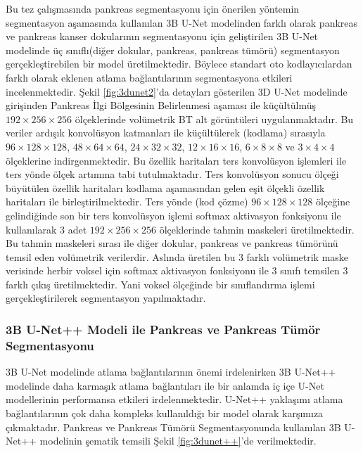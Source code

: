 Bu tez çalışmasında pankreas segmentasyonu için önerilen yöntemin segmentasyon aşamasında kullanılan 3B U-Net modelinden farklı olarak pankreas ve pankreas kanser dokularının segmentasyonu için geliştirilen 3B U-Net modelinde üç sınıflı(diğer dokular, pankreas, pankreas tümörü) segmentasyon gerçekleştirebilen bir model üretilmektedir. Böylece standart oto kodlayıcılardan farklı olarak eklenen atlama bağlantılarının segmentasyona etkileri incelenmektedir. Şekil \ref{fig:3dunet2}'da detayları gösterilen 3D U-Net modelinde girişinden Pankreas İlgi Bölgesinin Belirlenmesi aşaması ile küçültülmüş $192 \times 256 \times 256$ ölçeklerinde volümetrik BT alt görüntüleri uygulanmaktadır. Bu veriler ardışık konvolüsyon katmanları ile küçültülerek (kodlama) sırasıyla $96 \times 128 \times 128$, $48 \times 64 \times 64$, $24 \times 32 \times 32$, $12 \times 16 \times 16$, $6 \times 8 \times 8$ ve $3 \times 4 \times 4$ ölçeklerine indirgenmektedir. Bu özellik haritaları ters konvolüsyon işlemleri ile ters yönde ölçek artımına tabi tutulmaktadır. Ters konvolüsyon sonucu ölçeği büyütülen özellik haritaları kodlama aşamasından gelen eşit ölçekli özellik haritaları ile birleştirilmektedir. Ters yönde (kod çözme) $96 \times 128 \times 128$ ölçeğine gelindiğinde son bir ters konvolüsyon işlemi softmax aktivasyon fonksiyonu ile kullanılarak 3 adet $192 \times 256 \times 256$ ölçeklerinde tahmin maskeleri üretilmektedir. Bu tahmin maskeleri sırası ile diğer dokular, pankreas ve pankreas tümörünü temsil eden volümetrik verilerdir. Aslında üretilen bu 3 farklı volümetrik maske verisinde herbir voksel için softmax aktivasyon fonksiyonu ile 3 sınıfı temsilen 3 farklı çıkış üretilmektedir. Yani voksel ölçeğinde bir sınıflandırma işlemi gerçekleştirilerek segmentasyon yapılmaktadır.  


\subsubsection{3B U-Net++ Modeli ile Pankreas ve Pankreas Tümör Segmentasyonu}
3B U-Net modelinde atlama bağlantılarının önemi irdelenirken 3B U-Net++ modelinde daha karmaşık atlama bağlantıları ile bir anlamda iç içe U-Net modellerinin performansa etkileri irdelenmektedir. U-Net++ yaklaşımı atlama bağlantılarının çok daha kompleks kullanıldığı bir model olarak karşımıza çıkmaktadır. Pankreas ve Pankreas Tümörü Segmentasyonunda kullanılan 3B U-Net++  modelinin şematik temsili Şekil \ref{fig:3dunet++}'de verilmektedir. 

